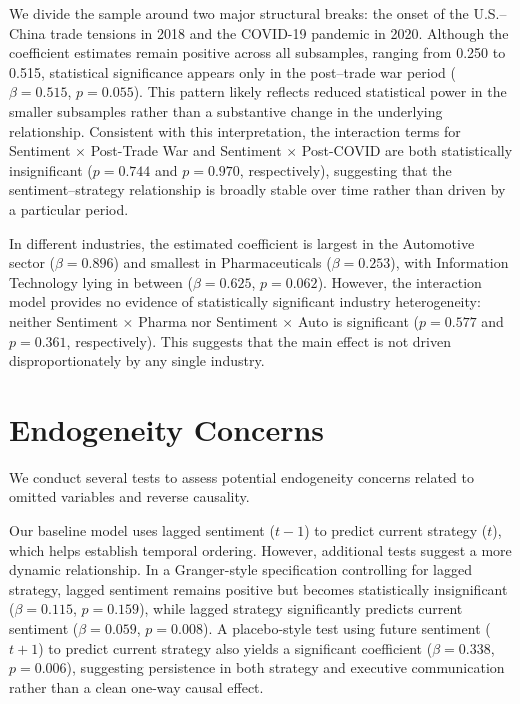 \documentclass{article}
\begin{document}
We divide the sample around two major structural breaks: the onset of
the U.S.--China trade tensions in 2018 and the COVID-19 pandemic in
2020. Although the coefficient estimates remain positive across all
subsamples, ranging from 0.250 to 0.515, statistical significance
appears only in the post--trade war period ($\beta = 0.515$, $p = 0.055$).
This pattern likely reflects reduced statistical power in the smaller
subsamples rather than a substantive change in the underlying
relationship. Consistent with this interpretation, the interaction terms
for Sentiment $\times$ Post-Trade War and Sentiment $\times$ Post-COVID are both
statistically insignificant ($p = 0.744$ and $p = 0.970$, respectively),
suggesting that the sentiment--strategy relationship is broadly stable
over time rather than driven by a particular period.

In different industries, the estimated coefficient is largest in the
Automotive sector ($\beta = 0.896$) and smallest in Pharmaceuticals ($\beta = 0.253$), with Information Technology lying in between ($\beta = 0.625$, $p = 0.062$). However, the interaction model provides no evidence of
statistically significant industry heterogeneity: neither Sentiment $\times$
Pharma nor Sentiment $\times$ Auto is significant ($p = 0.577$ and $p = 0.361$,
respectively). This suggests that the main effect is not driven
disproportionately by any single industry.

\section{Endogeneity Concerns}\label{endogeneity-concerns}

We conduct several tests to assess potential endogeneity concerns
related to omitted variables and reverse causality.

Our baseline model uses lagged sentiment ($t-1$) to predict current
strategy ($t$), which helps establish temporal ordering. However,
additional tests suggest a more dynamic relationship. In a Granger-style
specification controlling for lagged strategy, lagged sentiment remains
positive but becomes statistically insignificant ($\beta = 0.115$, $p = 0.159$), while lagged strategy significantly predicts current sentiment
($\beta = 0.059$, $p = 0.008$). A placebo-style test using future sentiment
($t+1$) to predict current strategy also yields a significant coefficient
($\beta = 0.338$, $p = 0.006$), suggesting persistence in both strategy and
executive communication rather than a clean one-way causal effect.
\end{document}
